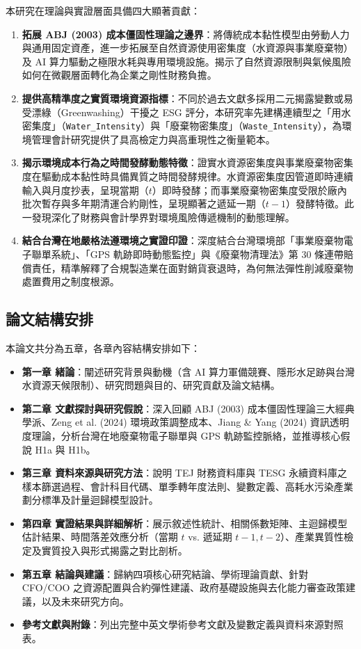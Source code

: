 \documentclass[12pt,a4paper]{article}
\begin{document}
本研究在理論與實證層面具備四大顯著貢獻：
\begin{enumerate}[leftmargin=*]
    \item \textbf{拓展 ABJ (2003) 成本僵固性理論之邊界}：將傳統成本黏性模型由勞動人力與通用固定資產，進一步拓展至自然資源使用密集度（水資源與事業廢棄物）及 AI 算力驅動之極限水耗與專用環境設施。揭示了自然資源限制與氣候風險如何在微觀層面轉化為企業之剛性財務負擔。
    \item \textbf{提供高精準度之實質環境資源指標}：不同於過去文獻多採用二元揭露變數或易受漂綠（Greenwashing）干擾之 ESG 評分，本研究率先建構連續型之「用水密集度」（\texttt{Water\_Intensity}）與「廢棄物密集度」（\texttt{Waste\_Intensity}），為環境管理會計研究提供了具高檢定力與高重現性之衡量範本。
    \item \textbf{揭示環境成本行為之時間發酵動態特徵}：證實水資源密集度與事業廢棄物密集度在驅動成本黏性時具備異質之時間發酵規律。水資源密集度因管道即時連續輸入與月度抄表，呈現當期（$t$）即時發酵；而事業廢棄物密集度受限於廠內批次暫存與多年期清運合約剛性，呈現顯著之遞延一期（$t-1$）發酵特徵。此一發現深化了財務與會計學界對環境風險傳遞機制的動態理解。
    \item \textbf{結合台灣在地嚴格法遵環境之實證印證}：深度結合台灣環境部「事業廢棄物電子聯單系統」、「GPS 軌跡即時動態監控」與《廢棄物清理法》第 30 條連帶賠償責任，精準解釋了合規製造業在面對銷貨衰退時，為何無法彈性削減廢棄物處置費用之制度根源。
\end{enumerate}

\subsection{論文結構安排}

本論文共分為五章，各章內容結構安排如下：
\begin{itemize}
    \item \textbf{第一章 緒論}：闡述研究背景與動機（含 AI 算力軍備競賽、隱形水足跡與台灣水資源天候限制）、研究問題與目的、研究貢獻及論文結構。
    \item \textbf{第二章 文獻探討與研究假說}：深入回顧 ABJ (2003) 成本僵固性理論三大經典學派、Zeng et al. (2024) 環境政策調整成本、Jiang \& Yang (2024) 資訊透明度理論，分析台灣在地廢棄物電子聯單與 GPS 軌跡監控脈絡，並推導核心假說 H1a 與 H1b。
    \item \textbf{第三章 資料來源與研究方法}：說明 TEJ 財務資料庫與 TESG 永續資料庫之樣本篩選過程、會計科目代碼、單季轉年度法則、變數定義、高耗水污染產業劃分標準及計量迴歸模型設計。
    \item \textbf{第四章 實證結果與詳細解析}：展示敘述性統計、相關係數矩陣、主迴歸模型估計結果、時間落差效應分析（當期 $t$ vs. 遞延期 $t-1, t-2$）、產業異質性檢定及實質投入與形式揭露之對比剖析。
    \item \textbf{第五章 結論與建議}：歸納四項核心研究結論、學術理論貢獻、針對 CFO/COO 之資源配置與合約彈性建議、政府基礎設施與去化能力審查政策建議，以及未來研究方向。
    \item \textbf{參考文獻與附錄}：列出完整中英文學術參考文獻及變數定義與資料來源對照表。
\end{itemize}
\end{document}
